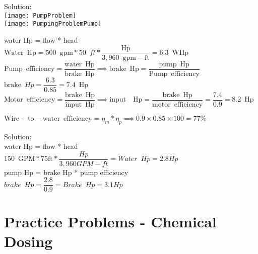  Solution:\\
 \vspace{0.4cm}\texttt{[image: PumpProblem]}\\
 \vspace{0.2cm}
 \texttt{[image: PumpingProblemPump]}
 \vspace{0.2cm}

water Hp = flow * head\\
 \vspace{0.2cm}
$\mathrm{Water} \enspace \mathrm{Hp} = 500 \enspace \mathrm{gpm}*50 \enspace ft*\dfrac{\mathrm{Hp}}{3,960 \enspace \mathrm{gpm-ft}}=\boxed{ 6.3 \enspace \mathrm{WHp}}$\\ 
  \vspace{0.2cm}
$\mathrm{Pump \enspace efficiency} =\dfrac{\mathrm{water \enspace Hp}}{\mathrm{brake \enspace Hp}} \implies \mathrm{brake \enspace Hp}=\dfrac{\mathrm{pump \enspace Hp}}{\mathrm{Pump \enspace efficiency}}$ \\
  \vspace{0.2cm}
$\textrm{brake} \enspace Hp = \dfrac{6.3}{0.85}=\boxed{7.4 \enspace \mathrm{Hp}}$\\
  \vspace{0.2cm}
$\mathrm{Motor \enspace efficiency} =\dfrac{\mathrm{brake \enspace Hp}}{\mathrm{input \enspace Hp}} \implies \mathrm{input \enspace \enspace Hp}=\dfrac{\mathrm{brake \enspace Hp}}{\mathrm{motor \enspace efficiency}}= \dfrac{7.4}{0.9}=\boxed{8.2 \enspace \mathrm{Hp}}$\\
  \vspace{0.2cm}
  
 \vspace{0.2cm}
$\mathrm{Wire-to-water} \enspace \mathrm{efficiency}=\eta_m * \eta_p \implies 0.9 \times 0.85 \times 100=\boxed{77 \%}$

 Solution:\\
\vspace{0.4cm}
water Hp = flow * head\\
$150 \enspace \mathrm{GPM}*75\mathrm{ft}*\dfrac{Hp}{3,960 GPM-ft}=\boxed{Water \enspace Hp = 2.8Hp}$\\
\vspace{0.4cm}
pump Hp = brake Hp * pump efficiency\\
$brake \enspace Hp = \dfrac{2.8}{0.9}=\boxed{Brake \enspace Hp=3.1Hp}$
 \vspace{0.2cm}




\section*{Practice Problems - Chemical Dosing}


